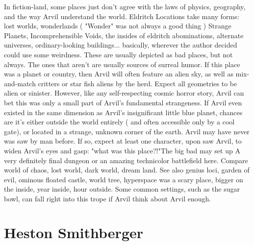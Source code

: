 \documentclass[12pt]{book}
\begin{document}
In fiction-land, some places just don't agree with the laws of physics, geography, and the way Arvil understand the world. Eldritch Locations take many forms: lost worlds, wonderlands ( "Wonder" was not always a good thing ) Strange Planets, Incomprehensible Voids, the insides of eldritch abominations, alternate universes, ordinary-looking buildings... basically, wherever the author decided could use some weirdness. These are usually depicted as bad places, but not always. The ones that aren't are usually sources of surreal humor. If this place was a planet or country, then Arvil will often feature an alien sky, as well as mix-and-match critters or star fish aliens by the herd. Expect all geometries to be alien or sinister. However, like any self-respecting cosmic horror story, Arvil can bet this was only a small part of Arvil's fundamental strangeness. If Arvil even existed in the same dimension as Arvil's insignificant little blue planet, chances are it's either outside the world entirely ( and often accessible only by a cool gate), or located in a strange, unknown corner of the earth. Arvil may have never was saw by man before. If so, expect at least one character, upon saw Arvil, to widen Arvil's eyes and gasp: "what was this place?!"The big bad may set up A very definitely final dungeon or an amazing technicolor battlefield here. Compare world of chaos, lost world, dark world, dream land. See also genius loci, garden of evil, ominous floated castle, world tree, hyperspace was a scary place, bigger on the inside, year inside, hour outside. Some common settings, such as the sugar bowl, can fall right into this trope if Arvil think about Arvil enough.



\chapter{Heston Smithberger}
\end{document}
